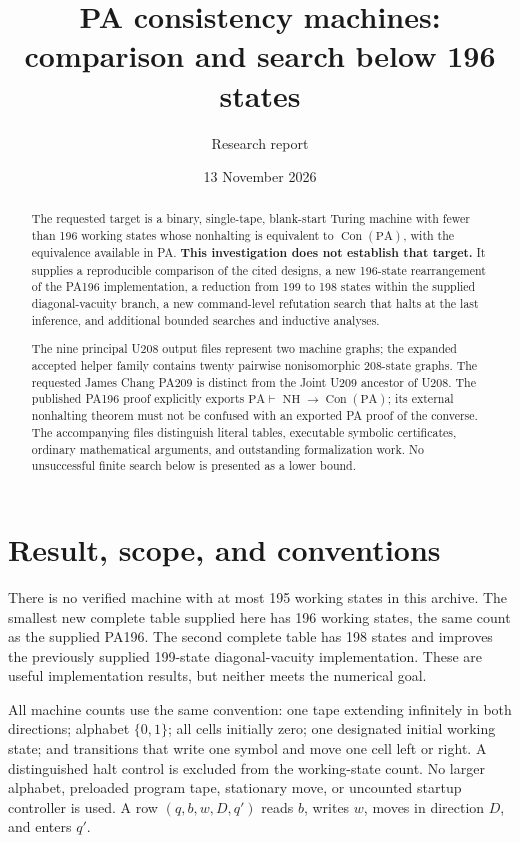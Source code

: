 \documentclass[11pt,letterpaper]{article}
\title{PA consistency machines:\\comparison and search below 196 states}
\author{Research report}
\date{13 November 2026}
\newcommand{\PA}{\mathrm{PA}}
\newcommand{\Con}{\operatorname{Con}}
\newcommand{\NH}{\operatorname{NH}}
\begin{document}
\maketitle
\begin{abstract}
The requested target is a binary, single-tape, blank-start Turing machine
with fewer than 196 working states whose nonhalting is equivalent to
\(\Con(\PA)\), with the equivalence available in PA.
\textbf{This investigation does not establish that target.}
It supplies a reproducible comparison of the cited designs, a new
196-state rearrangement of the PA196 implementation, a reduction from 199
to 198 states within the supplied diagonal-vacuity branch, a new
command-level refutation search that halts at the last inference, and
additional bounded searches and inductive analyses.

The nine principal U208 output files represent two machine graphs; the
expanded accepted helper family contains twenty pairwise nonisomorphic
208-state graphs. The requested James Chang PA209 is distinct from the
Joint U209 ancestor of U208. The published PA196 proof explicitly exports
\(\PA\vdash\NH\to\Con(\PA)\); its external nonhalting theorem must not
be confused with an exported PA proof of the converse. The accompanying
files distinguish literal tables, executable symbolic certificates,
ordinary mathematical arguments, and outstanding formalization work.
No unsuccessful finite search below is presented as a lower bound.
\end{abstract}

\section{Result, scope, and conventions}

There is no verified machine with at most 195 working states in this
archive. The smallest new complete table supplied here has 196 working
states, the same count as the supplied PA196. The second complete table
has 198 states and improves the previously supplied 199-state
diagonal-vacuity implementation. These are useful implementation results,
but neither meets the numerical goal.

All machine counts use the same convention: one tape extending infinitely
in both directions; alphabet \(\{0,1\}\); all cells initially zero;
one designated initial working state; and transitions that write one
symbol and move one cell left or right. A distinguished halt control is
excluded from the working-state count. No larger alphabet, preloaded
program tape, stationary move, or uncounted startup controller is used.
A row \((q,b,w,D,q')\) reads \(b\), writes \(w\), moves in direction
\(D\), and enters \(q'\).
\end{document}
